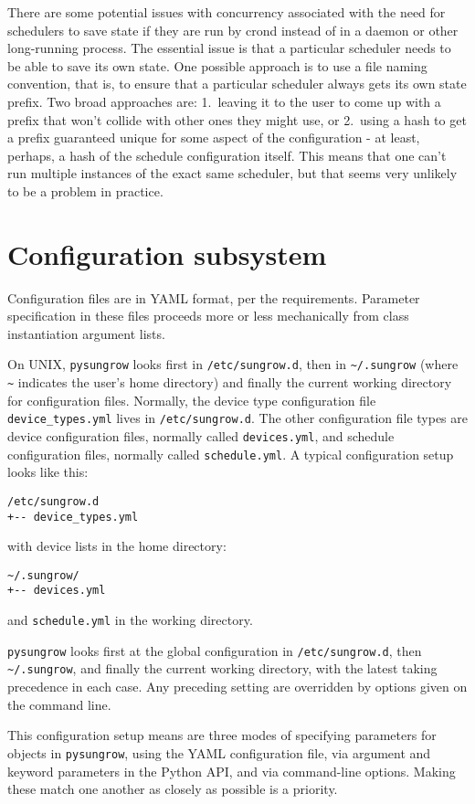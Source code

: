 \documentclass[pdftex,oneside,12pt,a4paper]{book}
\begin{document}
There are some potential issues with concurrency associated with the need for schedulers to save state if they are run by crond instead of in a daemon or other long-running process.  The essential issue is that a particular scheduler needs to be able to save its own state.  One possible approach is to use a file naming convention, that is, to ensure that a particular scheduler always gets its own state prefix.  Two broad approaches are: 1.\ leaving it to the user to come up with a prefix that won't collide with other ones they might use, or 2.\ using a hash to get a prefix guaranteed unique for some aspect of the configuration - at least, perhaps, a hash of the schedule configuration itself.  This means that one can't run multiple instances of the exact same scheduler, but that seems very unlikely to be a problem in practice.

\chapter{Configuration subsystem}
Configuration files are in YAML format, per the requirements.  Parameter specification in these files proceeds more or less mechanically from class instantiation argument lists.

On UNIX, \verb|pysungrow| looks first in \verb|/etc/sungrow.d|, then in \verb|~/.sungrow| (where \verb|~| indicates the user's home directory) and finally the current working directory for configuration files.  Normally, the device type configuration file \verb|device_types.yml| lives in \verb|/etc/sungrow.d|.  The other configuration file types are device configuration files, normally called \verb|devices.yml|, and schedule configuration files, normally called \verb|schedule.yml|.  A typical configuration setup looks like this:
\begin{verbatim}
/etc/sungrow.d
+-- device_types.yml
\end{verbatim}
with device lists in the home directory:
\begin{verbatim}
~/.sungrow/
+-- devices.yml
\end{verbatim}
and \verb|schedule.yml| in the working directory.

\verb|pysungrow| looks first at the global configuration in \verb|/etc/sungrow.d|, then \verb|~/.sungrow|, and finally the current working directory, with the latest taking precedence in each case.  Any preceding setting are overridden by options given on the command line.

This configuration setup means are three modes of specifying parameters for objects in \verb|pysungrow|, using the YAML configuration file, via argument and keyword parameters in the Python API, and via command-line options.  Making these match one another as closely as possible is a priority.
\end{document}
